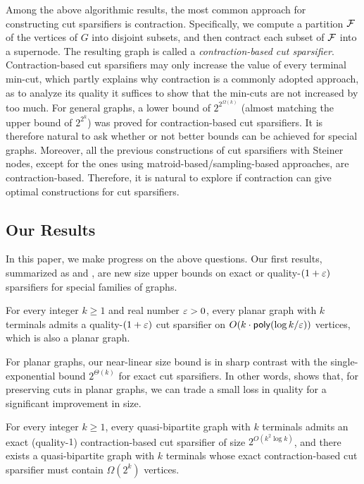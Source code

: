 Among the above algorithmic results, the most common approach for constructing cut sparsifiers is contraction. Specifically, we compute a partition ${\mathcal{F}}$ of the vertices of $G$ into disjoint subsets, and then contract each subset of ${\mathcal{F}}$ into a supernode.
The resulting graph is called a \emph{contraction-based cut sparsifier}.
%
Contraction-based cut sparsifiers may only increase the value of every terminal min-cut, which partly explains why contraction is a commonly adopted approach, as to analyze its quality it suffices to show that the min-cuts are not increased by too much.
For general graphs, a lower bound of $2^{2^{\Omega(k)}}$ (almost matching the upper bound of $2^{2^k}$) was proved \cite{karpov2017exponential} for contraction-based cut sparsifiers. It is therefore natural to ask whether or not better bounds can be achieved for special graphs.
Moreover, all the previous constructions of cut sparsifiers with Steiner nodes, except for the ones using matroid-based/sampling-based approaches, are contraction-based.
Therefore, it is natural to explore if contraction can give optimal constructions for cut sparsifiers.


\subsection{Our Results}


In this paper, we make progress on the above questions. Our first results, summarized as  and , are new size upper bounds on exact or quality-$(1+{\varepsilon})$ sparsifiers for special families of graphs.

\begin{theorem}
\label{main: upper}
For every integer $k\ge 1$ and real number ${\varepsilon}>0$, every planar graph with $k$ terminals admits a quality-$(1+{\varepsilon})$ cut sparsifier on $O(k\cdot\mathsf{poly}(\log k/{\varepsilon}))$ vertices, which is also a planar graph.
\end{theorem}

For planar graphs, our near-linear size bound is in sharp contrast with the single-exponential bound $2^{\Theta(k)}$ \cite{krauthgamer2013mimicking,krauthgamer2017refined,karpov2017exponential} for exact cut sparsifiers. In other words,  shows that, for preserving cuts in planar graphs, we can trade a small loss in quality for a significant improvement in size.

\begin{theorem}
	\label{quasi_1}
For every integer $k\ge 1$, every quasi-bipartite graph with $k$ terminals admits an exact (quality-$1$) contraction-based cut sparsifier of size $2^{O(k^2\log k)}$, and there exists a quasi-bipartite graph with $k$ terminals whose exact contraction-based cut sparsifier must contain $\Omega(2^k)$ vertices.
\end{theorem}

